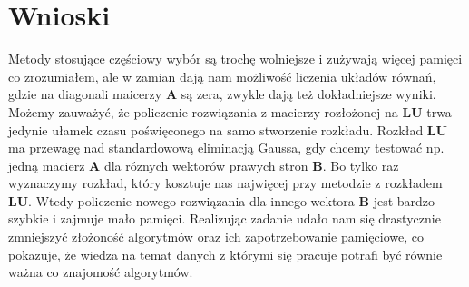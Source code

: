 \documentclass[]{article}
\begin{document}
\section{Wnioski} 
Metody stosujące częściowy wybór są trochę wolniejsze i zużywają więcej pamięci co zrozumiałem, ale w zamian dają nam możliwość liczenia układów równań, gdzie na diagonali maicerzy \textbf{A} są zera, zwykle dają też dokładniejsze wyniki. Możemy zauważyć, że policzenie rozwiązania z macierzy rozłożonej na \textbf{LU} trwa jedynie ułamek czasu poświęconego na samo stworzenie rozkładu. Rozkład \textbf{LU} ma przewagę nad standardowową eliminacją Gaussa, gdy chcemy testować np. jedną macierz \textbf{A} dla róznych wektorów prawych stron \textbf{B}. Bo tylko raz wyznaczymy rozkład, który kosztuje nas najwięcej przy metodzie z rozkładem \textbf{LU}. Wtedy policzenie nowego rozwiązania dla innego wektora \textbf{B} jest bardzo szybkie i zajmuje mało pamięci. Realizując zadanie udało nam się drastycznie zmniejszyć złożoność algorytmów oraz ich zapotrzebowanie pamięciowe, co pokazuje, że wiedza na temat danych z którymi się pracuje potrafi być równie ważna co znajomość algorytmów.
\end{document}
